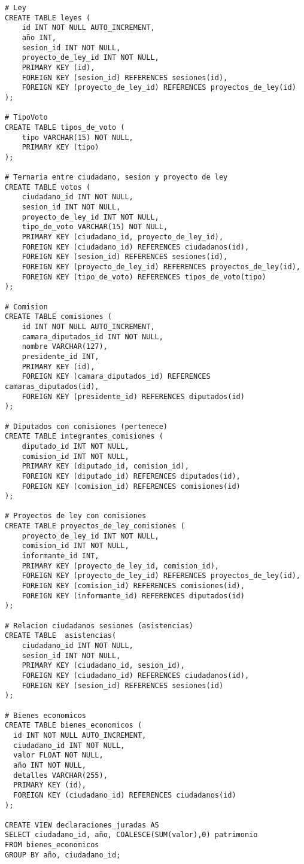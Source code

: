\begin{verbatim}
# Ley
CREATE TABLE leyes (
    id INT NOT NULL AUTO_INCREMENT,
    año INT,
    sesion_id INT NOT NULL,
    proyecto_de_ley_id INT NOT NULL,
    PRIMARY KEY (id),
    FOREIGN KEY (sesion_id) REFERENCES sesiones(id),
    FOREIGN KEY (proyecto_de_ley_id) REFERENCES proyectos_de_ley(id)
);

# TipoVoto
CREATE TABLE tipos_de_voto (
    tipo VARCHAR(15) NOT NULL,
    PRIMARY KEY (tipo)	
);

# Ternaria entre ciudadano, sesion y proyecto de ley
CREATE TABLE votos (
    ciudadano_id INT NOT NULL,
    sesion_id INT NOT NULL,
    proyecto_de_ley_id INT NOT NULL,
    tipo_de_voto VARCHAR(15) NOT NULL,
    PRIMARY KEY (ciudadano_id, proyecto_de_ley_id),
    FOREIGN KEY (ciudadano_id) REFERENCES ciudadanos(id),
    FOREIGN KEY (sesion_id) REFERENCES sesiones(id),
    FOREIGN KEY (proyecto_de_ley_id) REFERENCES proyectos_de_ley(id),
    FOREIGN KEY (tipo_de_voto) REFERENCES tipos_de_voto(tipo)
);

# Comision
CREATE TABLE comisiones (
    id INT NOT NULL AUTO_INCREMENT,
    camara_diputados_id INT NOT NULL,
    nombre VARCHAR(127),
    presidente_id INT,
    PRIMARY KEY (id),
    FOREIGN KEY (camara_diputados_id) REFERENCES camaras_diputados(id),
    FOREIGN KEY (presidente_id) REFERENCES diputados(id)
);

# Diputados con comisiones (pertenece)
CREATE TABLE integrantes_comisiones (
    diputado_id INT NOT NULL,
    comision_id INT NOT NULL,
    PRIMARY KEY (diputado_id, comision_id),
    FOREIGN KEY (diputado_id) REFERENCES diputados(id),
    FOREIGN KEY (comision_id) REFERENCES comisiones(id) 
);

# Proyectos de ley con comisiones
CREATE TABLE proyectos_de_ley_comisiones (
    proyecto_de_ley_id INT NOT NULL,
    comision_id INT NOT NULL,
    informante_id INT,
    PRIMARY KEY (proyecto_de_ley_id, comision_id),
    FOREIGN KEY (proyecto_de_ley_id) REFERENCES proyectos_de_ley(id),
    FOREIGN KEY (comision_id) REFERENCES comisiones(id),
    FOREIGN KEY (informante_id) REFERENCES diputados(id)  
);

# Relacion ciudadanos sesiones (asistencias) 
CREATE TABLE  asistencias(
    ciudadano_id INT NOT NULL,
    sesion_id INT NOT NULL,
    PRIMARY KEY (ciudadano_id, sesion_id),
    FOREIGN KEY (ciudadano_id) REFERENCES ciudadanos(id),
    FOREIGN KEY (sesion_id) REFERENCES sesiones(id) 
);

# Bienes economicos
CREATE TABLE bienes_economicos (
  id INT NOT NULL AUTO_INCREMENT,
  ciudadano_id INT NOT NULL,
  valor FLOAT NOT NULL,
  año INT NOT NULL,
  detalles VARCHAR(255),
  PRIMARY KEY (id),
  FOREIGN KEY (ciudadano_id) REFERENCES ciudadanos(id)
);

CREATE VIEW declaraciones_juradas AS
SELECT ciudadano_id, año, COALESCE(SUM(valor),0) patrimonio
FROM bienes_economicos
GROUP BY año, ciudadano_id;

\end{verbatim}

